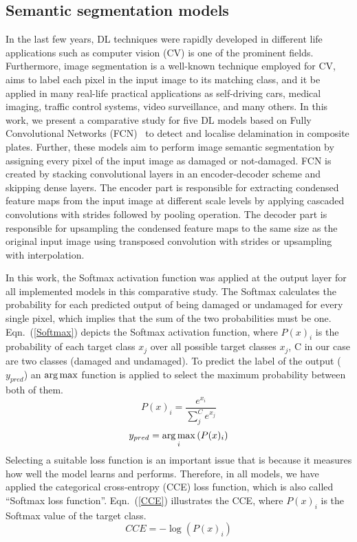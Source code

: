 \subsection{Semantic segmentation models}
\label{section:semantic_segmentation}
In the last few years, DL techniques were rapidly developed in different life applications such as computer vision (CV) is one of the prominent fields.  
Furthermore, image segmentation is a well-known technique employed for CV, aims to label each pixel in the input image to its matching class, and it be applied in many real-life practical applications as self-driving cars, medical imaging, traffic control systems, video surveillance, and many others.
In this work, we present a comparative study for five DL models based on Fully Convolutional Networks (FCN)~\cite{Long} to detect and localise delamination in composite plates.
Further, these models aim to perform image semantic segmentation by assigning every pixel of the input image as damaged or not-damaged. 
FCN is created by stacking convolutional layers in an encoder-decoder scheme and skipping dense layers. 
The encoder part is responsible for extracting condensed feature maps from the input image at different scale levels by applying cascaded convolutions with strides followed by pooling operation.
The decoder part is responsible for upsampling the condensed feature maps to the same size as the original input image using transposed convolution with strides or upsampling with interpolation.

In this work, the Softmax activation function was applied at the output layer for all implemented models in this comparative study.
The Softmax calculates the probability for each predicted output of being damaged or undamaged for every single pixel, which implies that the sum of the two probabilities must be one. 
Eqn.~(\ref{Softmax}) depicts the Softmax activation function, where \(P(x)_{i}\) is the probability of each target class \(x_{j}\) over all possible target classes \(x_{j}\), C in our case are two classes  (damaged and undamaged).
To predict the label of the output (\(y_{pred}\)) an \(\operatorname*{arg\,max}\) function is applied to select the maximum probability between both of them.
	\begin{equation}
		P(x)_{i} = \frac{e^{x_{i}}}{\sum_{j}^{C} e^{x_{j}}}
		\label{Softmax}
	\end{equation} 
	\begin{equation}
		y_{pred} = \operatorname*{arg\,max}_{i}\left( P(x)_{i} \right)
		\label{argmax}
	\end{equation}
Selecting a suitable loss function is an important issue that is because it measures how well the model learns and performs.
Therefore, in all models, we have applied the categorical cross-entropy (CCE) loss function, which is also called \enquote{Softmax loss function}.
Eqn.~(\ref{CCE}) illustrates the CCE, where \( P(x)_{i}\) is the Softmax value of the target class. 
	\begin{equation}
	CCE = -\log\left( P(x)_{i} \right)
	\label{CCE}
	\end{equation}

